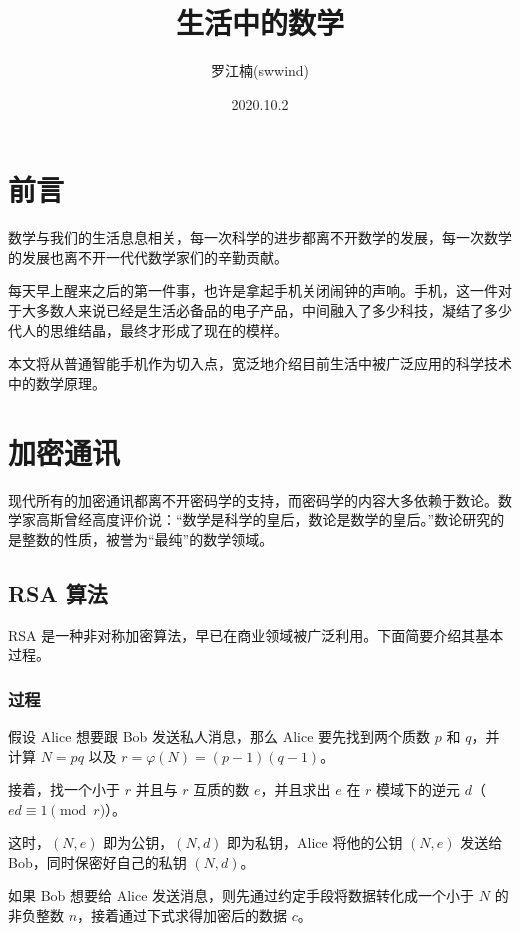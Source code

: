 \documentclass[hyperref,UTF8,12pt,a4paper]{ctexart}
\title{生活中的数学}
\author{罗江楠(swwind)}
\date{2020.10.2}
\begin{document}
\maketitle

\tableofcontents

\newpage

\section{前言}

数学与我们的生活息息相关，每一次科学的进步都离不开数学的发展，每一次数学的发展也离不开一代代数学家们的辛勤贡献。

每天早上醒来之后的第一件事，也许是拿起手机关闭闹钟的声响。手机，这一件对于大多数人来说已经是生活必备品的电子产品，中间融入了多少科技，凝结了多少代人的思维结晶，最终才形成了现在的模样。

本文将从普通智能手机作为切入点，宽泛地介绍目前生活中被广泛应用的科学技术中的数学原理。

\section{加密通讯}

现代所有的加密通讯都离不开密码学的支持，而密码学的内容大多依赖于数论。数学家高斯曾经高度评价说：“数学是科学的皇后，数论是数学的皇后。”数论研究的是整数的性质，被誉为“最纯”的数学领域。

\subsection{RSA 算法}

RSA 是一种非对称加密算法，早已在商业领域被广泛利用。下面简要介绍其基本过程。

\subsubsection{过程}

假设 Alice 想要跟 Bob 发送私人消息，那么 Alice 要先找到两个质数 $p$ 和 $q$，并计算 $N=pq$ 以及 $r=\varphi(N)=(p-1)(q-1)$。

接着，找一个小于 $r$ 并且与 $r$ 互质的数 $e$，并且求出 $e$ 在 $r$ 模域下的逆元 $d$（$ed \equiv 1 \pmod r$）。

这时，$(N, e)$ 即为公钥，$(N, d)$ 即为私钥，Alice 将他的公钥 $(N, e)$ 发送给 Bob，同时保密好自己的私钥 $(N, d)$。

如果 Bob 想要给 Alice 发送消息，则先通过约定手段将数据转化成一个小于 $N$ 的非负整数 $n$，接着通过下式求得加密后的数据 $c$。
\end{document}
